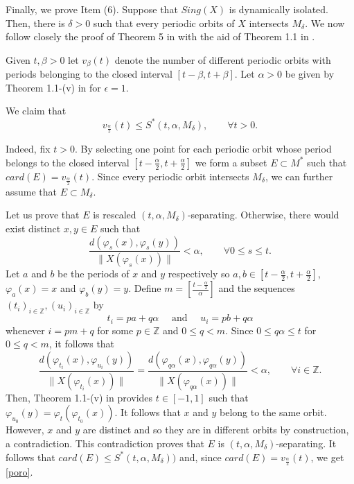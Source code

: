 \documentclass{amsart}
\numberwithin{equation}{section}
\begin{document}
Finally, we prove Item (6).
Suppose that $Sing(X)$ is dynamically isolated.
Then, there is $\delta>0$ such that every periodic orbits of $X$ intersects
$M_\delta$.
We now follow closely the proof of Theorem 5 in \cite{bw} with the aid of Theorem 1.1 in \cite{wy}.

Given $t,\beta>0$ let $v_\beta(t)$ denote the number of different periodic orbits with periods belonging to the closed interval $[t-\beta,t+\beta]$.
Let $\alpha>0$ be given by Theorem 1.1-(v) in \cite{wy} for $\epsilon=1$.

We claim that
\begin{equation}
\label{poro}
v_{\frac{\alpha}2}(t)\leq S^*(t,\alpha,M_\delta),\quad\quad\forall t>0.
\end{equation}


Indeed, fix $t>0$.
By selecting one point for each periodic orbit whose period belongs to the closed interval $[t-\frac{\alpha}2,t+\frac{\alpha}2]$ we form a subset $E\subset M^*$ such that $card(E)=v_{\frac{\alpha}2}(t)$.
Since every periodic orbit intersects $M_\delta$, we can further assume that $E\subset M_\delta$.

Let us prove that $E$ is rescaled $(t,\alpha,M_\delta)$-separating.
Otherwise, there would exist distinct $x,y\in E$ such that
$$
\frac{d(\varphi_s(x),\varphi_s(y))}{\|X(\varphi_s(x))\|}<\alpha,\quad\quad\forall 0\leq s\leq t.
$$
Let $a$ and $b$ be the periods of $x$ and $y$ respectively so
$a,b\in [t-\frac{\alpha}2,t+\frac{\alpha}2]$, $\varphi_a(x)=x$ and $\varphi_b(y)=y$.
Define $m=[\frac{t-\frac{\alpha}2}\alpha]$ and the sequences
$(t_i)_{i\in\mathbb{Z}},(u_i)_{i\in\mathbb{Z}}$ by
$$
t_i=pa+q\alpha\quad\mbox{ and }\quad u_i=pb+q\alpha
$$
whenever $i=pm+q$ for some $p\in \mathbb{Z}$ and $0\leq q<m.$
Since $0\leq q\alpha\leq t$ for $0\leq q<m$,
it follows that
$$
\frac{d(\varphi_{t_i}(x),\varphi_{u_i}(y))}{\|X(\varphi_{t_i}(x))\|}=\frac{d(\varphi_{q\alpha}(x),\varphi_{q\alpha}(y))}{\|X(\varphi_{q\alpha}(x))\|}<\alpha,\quad\quad\forall i\in\mathbb{Z}.
$$
Then, Theorem 1.1-(v) in \cite{wy} provides $t\in [-1,1]$ such that $\varphi_{u_0}(y)=\varphi_t(\varphi_{t_0}(x))$. It follows that
$x$ and $y$ belong to the same orbit. However, $x$ and $y$ are distinct and so they are in different orbits by construction, a contradiction. This contradiction proves that $E$ is $(t,\alpha,M_\delta)$-separating. It follows that
$card(E)\leq S^*(t,\alpha,M_\delta))$ and, since $card(E)=v_{\frac{\alpha}2}(t)$, we get \eqref{poro}.
\end{document}
